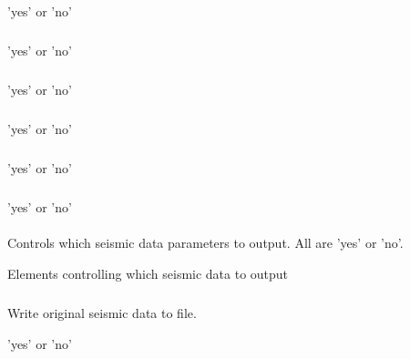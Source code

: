 \subparagraph{}
 \slist
   \item \Description
   \item \Argument 'yes' or 'no'
   \item \Default
 \elist

\subparagraph{}
 \slist
   \item \Description
   \item \Argument 'yes' or 'no'
   \item \Default
 \elist

\subparagraph{}
\slist
  \item \Description
  \item \Argument 'yes' or 'no'
  \item \Default
\elist

\subparagraph{}
 \slist
   \item \Description
   \item \Argument 'yes' or 'no'
   \item \Default
\elist

\subparagraph{}
 \slist
   \item \Description
   \item \Argument 'yes' or 'no'
   \item \Default
\elist

\subparagraph{}
 \slist
   \item \Description
   \item \Argument 'yes' or 'no'
   \item \Default
\elist

\paragraph{}
 \slist
   \item \Description Controls which seismic data parameters to output. All are 'yes' or 'no'.
   \item \Argument Elements controlling which seismic data to output
   \item \Default
 \elist
\subparagraph{}
 \slist
   \item \Description Write original seismic data to file.
   \item \Argument 'yes' or 'no'
   \item \Default
 \elist


